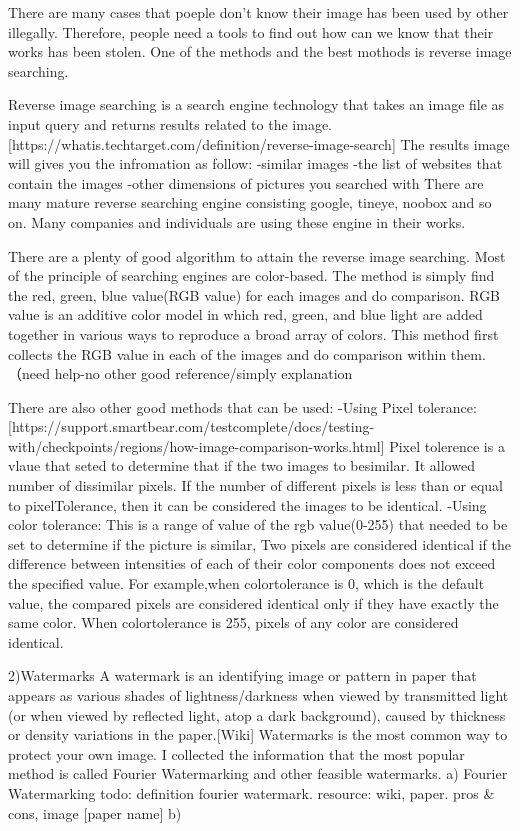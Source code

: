 There are many cases that poeple don't know their image has been used by other illegally.
Therefore, people need a tools to find out how can we know that their works has been stolen.
One of the methods and the best mothods is reverse image searching.

Reverse image searching is a search engine technology that takes an image file as input query and returns results related to the image.[https://whatis.techtarget.com/definition/reverse-image-search]
The results image will gives you the infromation as follow:
-similar images
-the list of websites that contain the images
-other dimensions of pictures you searched with
There are many mature reverse searching engine consisting google, tineye, noobox and so on.
Many companies and individuals are using these engine in their works.

There are a plenty of good algorithm to attain the reverse image searching.
Most of the principle of searching engines are color-based.
The method is simply find the red, green, blue value(RGB value) for each images and do comparison.
RGB value is an additive color model in which red, green, and blue light are added together in various ways to reproduce a broad array of colors.
This method first collects the RGB value in each of the images and do comparison within them. %
（need help-no other good reference/simply explanation

There are also other good methods that can be used:
-Using Pixel tolerance:
[https://support.smartbear.com/testcomplete/docs/testing-with/checkpoints/regions/how-image-comparison-works.html]
Pixel tolerence is a vlaue that seted to determine that if the two images to besimilar.
It allowed number of dissimilar pixels. 
If the number of different pixels is less than or equal to pixelTolerance, 
then it can be considered the images to be identical.
-Using color tolerance:
This is a range of value of the rgb value(0-255) that needed to be set to determine if the picture is similar,
Two pixels are considered identical if the difference between intensities of each of their color components does not exceed the specified value.
For example,when colortolerance is 0, which is the default value, the compared pixels are considered identical only if they have exactly the same color. 
When colortolerance is 255, pixels of any color are considered identical.


2)Watermarks  %
A watermark is an identifying image or pattern in paper that appears as various shades of lightness/darkness when viewed by transmitted light (or when viewed by reflected light, atop a dark background), 
caused by thickness or density variations in the paper.[Wiki]
Watermarks is the most common way to protect your own image.
I collected the information that the most popular method is called Fourier Watermarking and other feasible watermarks.
a) Fourier Watermarking
todo: definition fourier watermark. resource: wiki, paper. pros & cons, image [paper name]
b)






